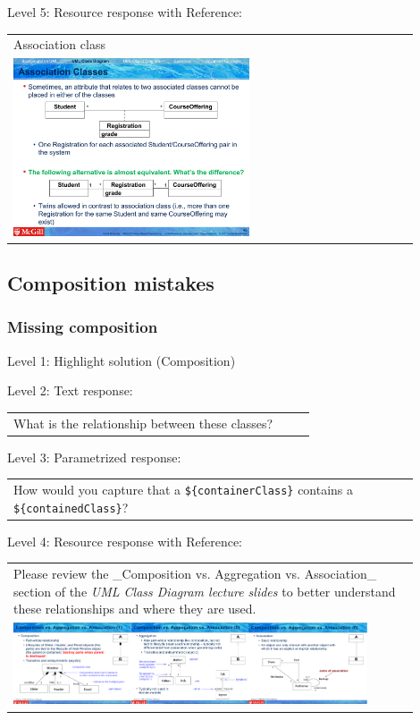 \noindent Level 5: Resource response with Reference: \medskip

\begin{tabular}{|p{0.9\linewidth}}
Association class

\\
\includegraphics[width=0.6\textwidth]{images/association_class.png}
\end{tabular} \medskip


\subsection{Composition mistakes}

\subsubsection{Missing composition}

\noindent Level 1: Highlight solution (Composition) \medskip

\noindent Level 2: Text response: \medskip

\begin{tabular}{|p{0.9\linewidth}}
What is the relationship between these classes?
\end{tabular} \medskip

\noindent Level 3: Parametrized response: \medskip

\begin{tabular}{|p{0.9\linewidth}}
How would you capture that a \verb|${containerClass}| contains a \verb|${containedClass}|?
\end{tabular} \medskip

\noindent Level 4: Resource response with Reference: \medskip

\begin{tabular}{|p{0.9\linewidth}}
Please review the _Composition vs. Aggregation vs. Association_ section of 
the \textit{UML Class Diagram lecture slides} to 
better understand these relationships and where they are used.

\\
\includegraphics[width=0.9\textwidth]{images/composition_aggregation_association.png}
\end{tabular} \medskip


